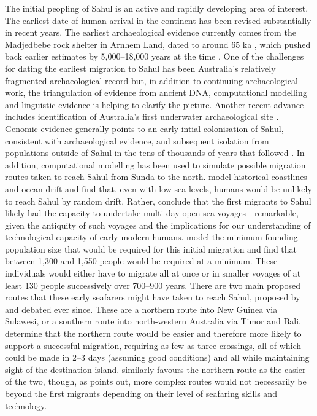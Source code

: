 The initial peopling of Sahul is an active and rapidly developing area of interest. The earliest date of human arrival in the continent has been revised substantially in recent years. The earliest archaeological evidence currently comes from the Madjedbebe rock shelter in Arnhem Land, dated to around 65 ka \autocites{clarkson_human_2017}[see also][]{florin_first_2020}, which pushed back earlier estimates by 5,000--18,000 years at the time \autocites{oconnell_process_2015}{clarkson_archaeology_2015}. One of the challenges for dating the earliest migration to Sahul has been Australia's relatively fragmented archaeological record \autocite{bradshaw_minimum_2019} but, in addition to continuing archaeological work, the triangulation of evidence from ancient DNA, computational modelling and linguistic evidence is helping to clarify the picture. Another recent advance includes identification of Australia's first underwater archaeological site \autocite{benjamin_aboriginal_2020}. Genomic evidence generally points to an early intial colonisation of Sahul, consistent with archaeological evidence, and subsequent isolation from populations outside of Sahul in the tens of thousands of years that followed \autocites{hudjashov_revealing_2007}{nagle_aboriginal_2017}{pedro_papuan_2020}. In addition, computational modelling has been used to simulate possible migration routes taken to reach Sahul from Sunda to the north. \textcite{bird_early_2019} model historical coastlines and ocean drift and find that, even with low sea levels, humans would be unlikely to reach Sahul by random drift. Rather, \textcite{bird_early_2019} conclude that the first migrants to Sahul likely had the capacity to undertake multi-day open sea voyages---remarkable, given the antiquity of such voyages and the implications for our understanding of technological capacity of early modern humans. \textcite{bradshaw_minimum_2019} model the minimum founding population size that would be required for this initial migration and find that between 1,300 and 1,550 people would be required at a minimum. These individuals would either have to migrate all at once or in smaller voyages of at least 130 people successively over 700--900 years. There are two main proposed routes that these early seafarers might have taken to reach Sahul, proposed by \textcite{birdsell_recalibration_1977} and debated ever since. These are a northern route into New Guinea via Sulawesi, or a southern route into north-western Australia via Timor and Bali. \textcite{bradshaw_minimum_2019} determine that the northern route would be easier and therefore more likely to support a successful migration, requiring as few as three crossings, all of which could be made in 2--3 days (assuming good conditions) and all while maintaining sight of the destination island. \textcite{kealy_least-cost_2018} similarly favours the northern route as the easier of the two, though, as \textcite{bradshaw_minimum_2019} points out, more complex routes would not necessarily be beyond the first migrants depending on their level of seafaring skills and technology.

